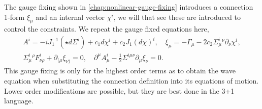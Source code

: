 \documentclass[10pt]{report}
\theoremstyle{definition}
\begin{document}
    The gauge fixing shown in \cref{chap:nonlinear-gauge-fixing} introduces a connection 1-form $\xi_\mu$ and an internal vector $\chi^i$, we will that see these are introduced to control the constraints. We repeat the gauge fixed equations here, 
    \begin{align} \label{eq:num-covariant-hyperbolic-gauge-fixing}
        A^i = -i J_1^{-1}(\star d\Sigma^i) + c_1 d\chi^i + c_2 J_1(d\chi)^i, \quad \xi_\mu = - \Gamma_\mu - 2 c_2 \Sigma^i_\mu{}^\nu \partial_\nu \chi^i, \\
        \Sigma^i_\mu{}^\rho F^i_{\nu\rho} + \partial_{(\mu} \xi_{\nu)} = 0, \quad \partial^\mu A^i_\mu - \frac{1}{2} \Sigma^{i\mu\nu} \partial_\mu \xi_\nu = 0.
    \end{align}
    This gauge fixing is only for the highest order terms as to obtain the wave equation when substituting the connection definition into its equations of motion. Lower order modifications are possible, but they are best done in the 3+1 language.
    
\end{document}
